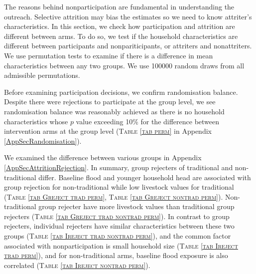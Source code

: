 	The reasons behind nonparticipation are fundamental in understanding the outreach. Selective attrition may bias the estimates so we need to know attriter's characteristics. In this section, we check how participation and attrition are different between arms. To do so, we test if the household characteristics are different between participants and nonpariticipants, or attriters and nonattriters. We use permutation tests to examine if there is a difference in mean characteristics between any two groups. We use 100000 random draws from all admissible permutations.

	Before examining participation decisions, we confirm randomisation balance. Despite there were rejections to participate at the group level, we see randomisation balance was reasonably achieved as there is no household characteristics whose $p$ value exceeding 10\% for the difference between intervention arms at the group level (\textsc{\normalsize Table \ref{tab perm}} in Appendix \ref{AppSecRandomisation}).

	We examined the difference between various groups in Appendix \ref{AppSecAttritionRejection}. In summary, group rejecters of \textsf{traditional} and non-\textsf{traditional} differ. Baseline flood and younger household head are associated with group rejection for non-\textsf{traditional} while low livestock values for \textsf{traditional} (\textsc{\normalsize Table \ref{tab Greject trad perm}}, \textsc{\normalsize Table \ref{tab Greject nontrad perm}}). Non-\textsf{traditional} group rejecter have more livestock values than \textsf{traditional} group rejecters (\textsc{\normalsize Table \ref{tab Greject trad nontrad perm}}). In contrast to group rejecters, individual rejecters have similar characteristics between these two groups (\textsc{\normalsize Table \ref{tab Ireject trad nontrad perm}}), and the common factor associated with nonparticipation is small household size (\textsc{\normalsize Table \ref{tab Ireject trad perm}}), and for non-\textsf{traditional} arms, baseline flood exposure is also correlated (\textsc{\normalsize Table \ref{tab Ireject nontrad perm}}).

